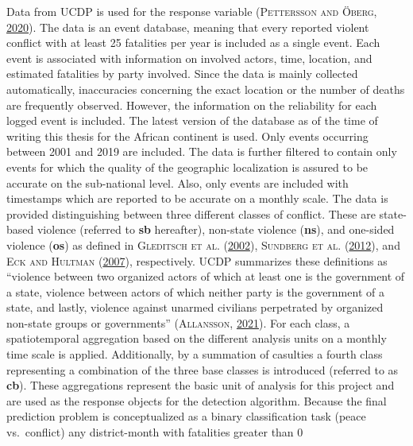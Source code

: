 \documentclass[a4paper,11pt]{article}
\begin{document}
Data from UCDP is used for the response variable \textsc{(\textnormal{\textsc{Pettersson} and \textsc{Öberg}}, \textnormal{\protect\hyperlink{ref-pettersson2020}{2020}})}.
The data is an event database, meaning that every
reported violent conflict with at least 25 fatalities per year is included as a single event.
Each event is associated with information on involved actors, time, location,
and estimated fatalities by party involved. Since the data is mainly
collected automatically, inaccuracies concerning the exact location or the
number of deaths are frequently observed. However, the information on the
reliability for each logged event is included.
The latest version of the database as of the time of writing this thesis
for the African continent is used. Only events occurring between 2001 and 2019 are
included. The data is further filtered to contain only events for which the quality of
the geographic localization is assured to be accurate on the sub-national level.
Also, only events are included with timestamps which are reported to be accurate
on a monthly scale. The data is provided distinguishing between three different classes of conflict.
These are state-based violence (referred to \textbf{sb} hereafter), non-state violence
(\textbf{ns}), and one-sided violence (\textbf{os}) as defined in \textsc{\textnormal{Gleditsch} \textnormal{et al.}} \textsc{(\textnormal{\protect\hyperlink{ref-gleditsch2002a}{2002}})}, \textsc{\textnormal{Sundberg} \textnormal{et al.}} \textsc{(\textnormal{\protect\hyperlink{ref-sundberg2012}{2012}})},
and \textsc{\textnormal{Eck} and \textnormal{Hultman}} \textsc{(\textnormal{\protect\hyperlink{ref-eck2007}{2007}})}, respectively. UCDP summarizes these definitions as ``violence between two organized actors of which
at least one is the government of a state, violence between actors of which neither
party is the government of a state, and lastly, violence against unarmed
civilians perpetrated by organized non-state groups or governments'' \textsc{(\textnormal{\textsc{Allansson}}, \textnormal{\protect\hyperlink{ref-allansson}{2021}})}.
For each class, a spatiotemporal aggregation based on the different analysis units
on a monthly time scale is applied. Additionally, by a summation of casulties a fourth class
representing a combination of the three base classes is introduced (referred to
as \textbf{cb}). These aggregations represent the basic unit of analysis for this
project and are used as the response objects for the detection algorithm.
Because the final prediction problem is conceptualized as a binary
classification task (peace vs.~conflict) any district-month with fatalities greater than 0
\end{document}
